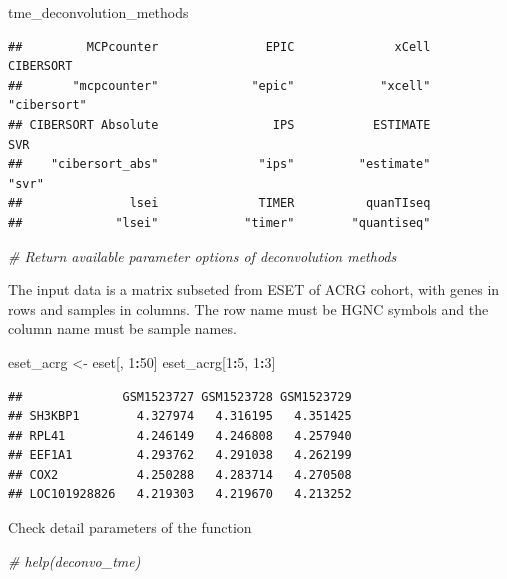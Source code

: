 \documentclass[
  12pt,
]{book}
\newenvironment{Shaded}{\begin{snugshade}}{\end{snugshade}}
\newcommand{\CommentTok}[1]{\textcolor[rgb]{0.56,0.35,0.01}{\textit{#1}}}
\newcommand{\DecValTok}[1]{\textcolor[rgb]{0.00,0.00,0.81}{#1}}
\newcommand{\NormalTok}[1]{#1}
\newcommand{\OtherTok}[1]{\textcolor[rgb]{0.56,0.35,0.01}{#1}}
\newcommand{\SpecialCharTok}[1]{\textcolor[rgb]{0.81,0.36,0.00}{\textbf{#1}}}
\theoremstyle{definition}
\theoremstyle{definition}
\theoremstyle{definition}
\theoremstyle{definition}
\theoremstyle{remark}
\begin{document}
\begin{Shaded}
\begin{Highlighting}[]
\NormalTok{tme\_deconvolution\_methods}
\end{Highlighting}
\end{Shaded}

\begin{verbatim}
##         MCPcounter               EPIC              xCell          CIBERSORT 
##       "mcpcounter"             "epic"            "xcell"        "cibersort" 
## CIBERSORT Absolute                IPS           ESTIMATE                SVR 
##    "cibersort_abs"              "ips"         "estimate"              "svr" 
##               lsei              TIMER          quanTIseq 
##             "lsei"            "timer"        "quantiseq"
\end{verbatim}

\begin{Shaded}
\begin{Highlighting}[]
\CommentTok{\# Return available parameter options of deconvolution methods}
\end{Highlighting}
\end{Shaded}

The input data is a matrix subseted from ESET of ACRG cohort, with genes in rows and samples in columns. The row name must be HGNC symbols and the column name must be sample names.

\begin{Shaded}
\begin{Highlighting}[]
\NormalTok{eset\_acrg }\OtherTok{\textless{}{-}}\NormalTok{ eset[, }\DecValTok{1}\SpecialCharTok{:}\DecValTok{50}\NormalTok{]}
\NormalTok{eset\_acrg[}\DecValTok{1}\SpecialCharTok{:}\DecValTok{5}\NormalTok{, }\DecValTok{1}\SpecialCharTok{:}\DecValTok{3}\NormalTok{]}
\end{Highlighting}
\end{Shaded}

\begin{verbatim}
##              GSM1523727 GSM1523728 GSM1523729
## SH3KBP1        4.327974   4.316195   4.351425
## RPL41          4.246149   4.246808   4.257940
## EEF1A1         4.293762   4.291038   4.262199
## COX2           4.250288   4.283714   4.270508
## LOC101928826   4.219303   4.219670   4.213252
\end{verbatim}

Check detail parameters of the function

\begin{Shaded}
\begin{Highlighting}[]
\CommentTok{\# help(deconvo\_tme)}
\end{Highlighting}
\end{Shaded}
\end{document}
